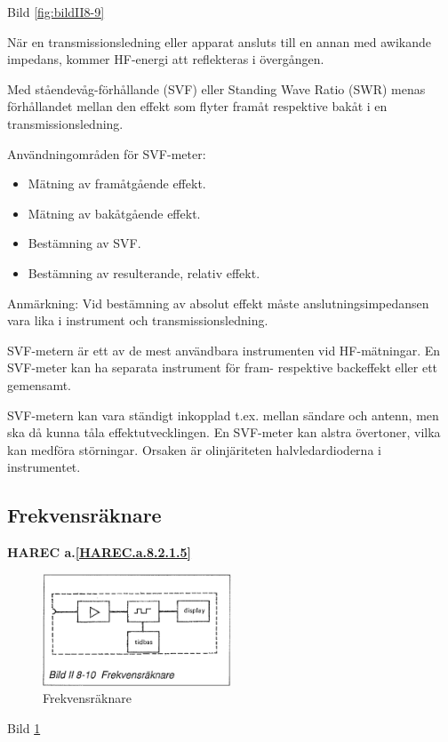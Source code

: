 Bild \ref{fig:bildII8-9}

När en transmissionsledning eller apparat ansluts till en annan med
awikande impedans, kommer HF-energi att reflekteras i övergången.

Med ståendevåg-förhållande (SVF) eller Standing Wave Ratio (SWR)
menas förhållandet mellan den effekt som flyter framåt respektive
bakåt i en transmissionsledning.

Användningområden för SVF-meter:
\begin{itemize}
\item Mätning av framåtgående effekt.
\item Mätning av bakåtgående effekt.
\item Bestämning av SVF.
\item Bestämning av resulterande, relativ effekt.
\end{itemize}

Anmärkning: Vid bestämning av absolut effekt måste
anslutningsimpedansen vara lika i instrument och transmissionsledning.

SVF-metern är ett av de mest användbara instrumenten vid
HF-mätningar. En SVF-meter kan ha separata instrument för fram-
respektive backeffekt eller ett gemensamt.

SVF-metern kan vara ständigt inkopplad t.ex. mellan sändare och
antenn, men ska då kunna tåla effektutvecklingen. En SVF-meter kan
alstra övertoner, vilka kan medföra störningar. Orsaken är
olinjäriteten halvledardioderna i instrumentet.

\subsection{Frekvensräknare}
\textbf{
HAREC a.\ref{HAREC.a.8.2.1.5}\label{myHAREC.a.8.2.1.5}
}

\begin{figure}
  \includegraphics[width=0.5\textwidth]{images/bild_2_8-10}
  \caption{Frekvensräknare}
  \label{fig:bildII8-10}
\end{figure}

Bild \ref{fig:bildII8-10}

